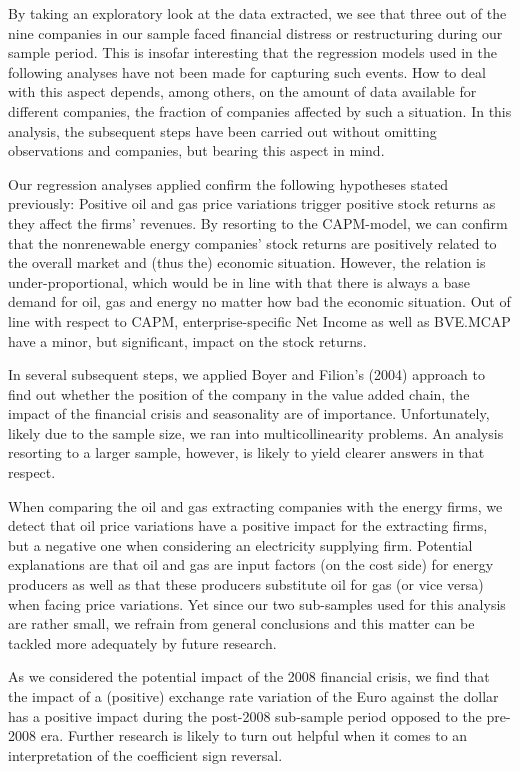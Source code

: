 \documentclass[a4paper]{article}
\begin{document}
By taking an exploratory look at the data extracted, we see that three out of the nine companies in our sample faced financial distress or restructuring during our sample period. This is insofar interesting that the regression models used in the following analyses have not been made for capturing such events. How to deal with this aspect depends, among others, on the amount of data available for different companies, the fraction of companies affected by such a situation. In this analysis, the subsequent steps have been carried out without omitting observations and companies, but bearing this aspect in mind.

Our regression analyses applied confirm the following hypotheses stated previously: Positive oil and gas price variations trigger positive stock returns as they affect the firms' revenues. By resorting to the CAPM-model, we can confirm that the nonrenewable energy companies' stock returns are positively related to the overall market and (thus the) economic situation. However, the relation is under-proportional, which would be in line with that there is always a base demand for oil, gas and energy no matter how bad the economic situation. Out of line with respect to CAPM, enterprise-specific Net Income as well as BVE.MCAP have a minor, but significant, impact on the stock returns.

In several subsequent steps, we applied Boyer and Filion's (2004) approach to find out whether the position of the company in the value added chain, the impact of the financial crisis and seasonality are of importance. Unfortunately, likely due to the sample size, we ran into multicollinearity problems. An analysis resorting to a larger sample, however, is likely to yield clearer answers in that respect. 

When comparing the oil and gas extracting companies with the energy firms, we detect that oil price variations have a positive impact for the extracting firms, but a negative one when considering an electricity supplying firm. Potential explanations are that oil and gas are input factors (on the cost side) for energy producers as well as that these producers substitute oil for gas (or vice versa) when facing price variations. Yet since our two sub-samples used for this analysis are rather small, we refrain from general conclusions and this matter can be tackled more adequately by future research. 

As we considered the potential impact of the 2008 financial crisis, we find that the impact of a (positive) exchange rate variation of the Euro against the dollar has a positive impact during the post-2008 sub-sample period opposed to the pre-2008 era. Further research is likely to turn out helpful when it comes to an interpretation of the coefficient sign reversal. 
\end{document}
